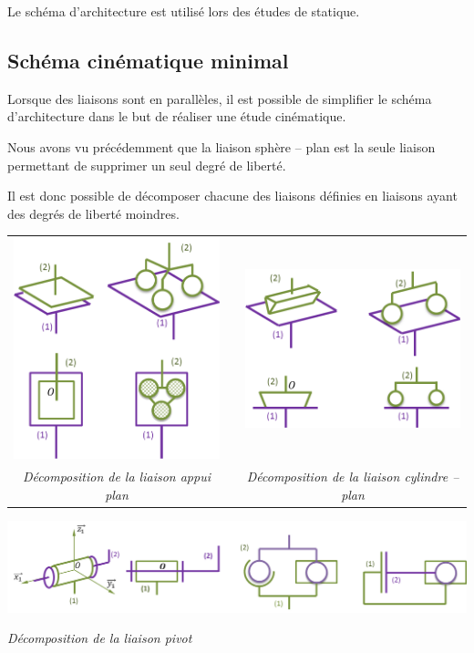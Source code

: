 \documentclass[10pt,oneside]{article}
\begin{document}
\begin{rem}
Le schéma d'architecture est utilisé lors des études de statique.
\end{rem}

\subsection{Schéma cinématique minimal}
Lorsque des liaisons sont en parallèles, il est possible de simplifier le schéma d'architecture dans le but de réaliser une étude cinématique.



Nous avons vu précédemment que la liaison sphère -- plan est la seule liaison permettant de supprimer un seul degré de liberté. 

Il est donc possible de décomposer chacune des liaisons définies en liaisons ayant des degrés de liberté moindres. 
\begin{exemple}
\begin{center}
\begin{tabular}{ccc}
\includegraphics[width=.4\textwidth]{png/plan_eq} &&
\includegraphics[width=.4\textwidth]{png/rectiligne_eq}\\
\textit{Décomposition de la liaison appui plan} && \textit{Décomposition de la liaison cylindre -- plan}\\
\end{tabular}
\end{center}

\begin{center}
\includegraphics[width=.9\textwidth]{png/pivot_eq}

\textit{Décomposition de la liaison pivot}
\end{center}

\end{exemple}
\end{document}
